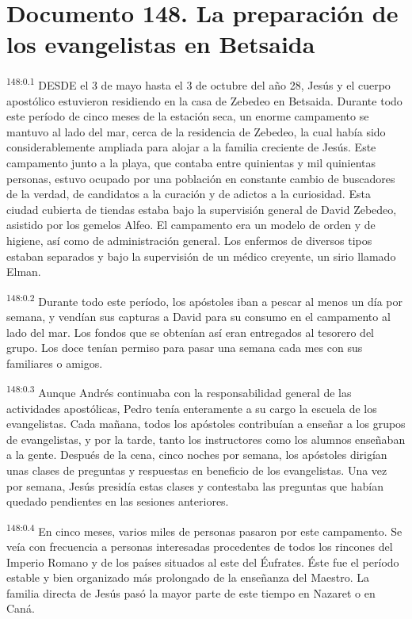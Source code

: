 \chapter{Documento 148. La preparación de los evangelistas en Betsaida}
\par 
\textsuperscript{148:0.1} DESDE el 3 de mayo hasta el 3 de octubre del año 28, Jesús y el cuerpo apostólico estuvieron residiendo en la casa de Zebedeo en Betsaida. Durante todo este período de cinco meses de la estación seca, un enorme campamento se mantuvo al lado del mar, cerca de la residencia de Zebedeo, la cual había sido considerablemente ampliada para alojar a la familia creciente de Jesús. Este campamento junto a la playa, que contaba entre quinientas y mil quinientas personas, estuvo ocupado por una población en constante cambio de buscadores de la verdad, de candidatos a la curación y de adictos a la curiosidad. Esta ciudad cubierta de tiendas estaba bajo la supervisión general de David Zebedeo, asistido por los gemelos Alfeo. El campamento era un modelo de orden y de higiene, así como de administración general. Los enfermos de diversos tipos estaban separados y bajo la supervisión de un médico creyente, un sirio llamado Elman.

\par 
\textsuperscript{148:0.2} Durante todo este período, los apóstoles iban a pescar al menos un día por semana, y vendían sus capturas a David para su consumo en el campamento al lado del mar. Los fondos que se obtenían así eran entregados al tesorero del grupo. Los doce tenían permiso para pasar una semana cada mes con sus familiares o amigos.

\par 
\textsuperscript{148:0.3} Aunque Andrés continuaba con la responsabilidad general de las actividades apostólicas, Pedro tenía enteramente a su cargo la escuela de los evangelistas. Cada mañana, todos los apóstoles contribuían a enseñar a los grupos de evangelistas, y por la tarde, tanto los instructores como los alumnos enseñaban a la gente. Después de la cena, cinco noches por semana, los apóstoles dirigían unas clases de preguntas y respuestas en beneficio de los evangelistas. Una vez por semana, Jesús presidía estas clases y contestaba las preguntas que habían quedado pendientes en las sesiones anteriores.

\par 
\textsuperscript{148:0.4} En cinco meses, varios miles de personas pasaron por este campamento. Se veía con frecuencia a personas interesadas procedentes de todos los rincones del Imperio Romano y de los países situados al este del Éufrates. Éste fue el período estable y bien organizado más prolongado de la enseñanza del Maestro. La familia directa de Jesús pasó la mayor parte de este tiempo en Nazaret o en Caná.

